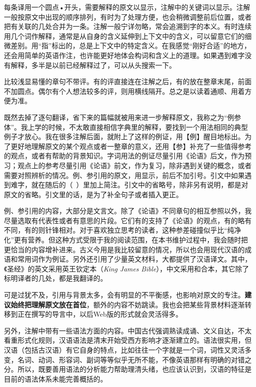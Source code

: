 每条译用一个圆点•开头，需要解释的原文以显示，注解中的关键词以显示。注解一般按原文中出现的顺序排列，有时为了处理方便，也会稍微调整前后位置，或者把有关联的几处合并为一条。注解一般宁详勿略，常会追溯到字的本义。有时连续用几个词作解释，通常是从自身的含义延伸到上下文中的含义，可以留意它们的细微差别。用“指”标出的，总是上下文中的特定含义。在我感觉“刚好合适”的地方，还会用简单的英语作注，也许能更好地体会构词和含义上的道理。如果遇到难字没有解释，多半是以前已经解释过了，可以从头搜索一下。

比较浅显易懂的章句不带评。有的评直接连在注解之后，有的放在整章末尾，前面不加圆点。偶尔有个人想法较多的评，则用横线隔开。总之是以读着通顺、用着方便为准。

既然去掉了逐句翻译，省下来的篇幅就被用来进一步解释原文，我称之为“例参体”。我上学的时候，不太敢直接相信字典里的解释，要找到一个用法相同的典型例子才放心。我在很多注解后面，就附上了这样的例证，用【例】醒目地标出。为了更好地理解原文的某个观点或者一整章的意义，还用【参】补充了一些值得参考的观点，或者有帮助的背景知识。字词用法的例证尽量引用《论语》后文，作为预习；观点上的参考尽量引用《论语》前文，作为复习，除非遇到关键的概念，或者需要对照辨析的情况。例、参引用的原文，用显示，前后不加引号。引文中如果遇到难字，就在随后的（~）里加上简注。引文中的省略号，除非另有说明，都是对原文的省略。引文里的话，是为了补全句子或者插入更正。

例、参引用的内容，大部分是文言文。除了《论语》不同章句的相互参照以外，我尽量选取有代表性或者有意思的片段。它们有的支持了《论语》的观点，有的略有不同，有的则针锋相对。对于喜欢独立思考的读者，这种参差碰撞似乎比“纯净化”更有营养。但这种方式受限于我的阅读范围，在本书维护过程中，我会随时把更恰当的内容增补进来。古义今用是我比较留意的情况，所以也会用现代汉语的成语和常用词作为例证。另外还引用了少量英文材料，大都提供了汉语译文。其中，《圣经》的英文采用英王钦定本（\emph{King James Bible}），中文采用和合本，其它除了标明译者的几处，都是我翻译的。

可是过犹不及，引用与背景太多，会有明显的不平衡感，也影响对原文的专注。\textbf{建议始终把理解原文放在首位}，额外的内容不妨跳读。我也会把某些背景材料逐渐转移到正在撰写的导言中，以后Web版的形式就会灵活得多。

另外，注解中带有一些语法方面的内容。中国古代强调熟读成诵、文义自达，不太看重形式化规则，汉语语法是清末开始受西方影响才逐渐建立的。语法很实用，但汉语（包括古汉语）有它自身的特点，比如往往一个字就是一个词，词性又灵活多变，名词、动词、形容词、副词等等似乎无所不能，不像英语那样有明确的对错之分。所以，既要善用语法的分析能力帮助理清头绪，也应该认识到，汉语的特征是目前的语法体系未能完善概括的。

